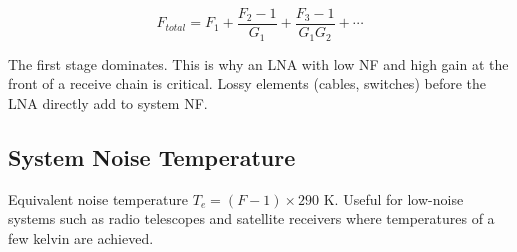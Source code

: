 				


				
\[F_{total} = F_1 + \dfrac{F_2-1}{G_1} + \dfrac{F_3-1}{G_1 G_2} + \cdots\]

				

The first stage dominates. This is why an LNA with low NF and high gain at the front of a receive chain is critical. Lossy elements (cables, switches) before the LNA directly add to system NF.

				

\subsection{System Noise Temperature}

				

Equivalent noise temperature $T_e = (F-1) \times 290$ K. Useful for low-noise systems such as radio telescopes and satellite receivers where temperatures of a few kelvin are achieved.



